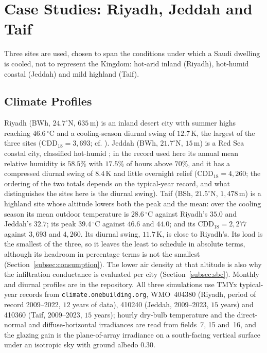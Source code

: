 \documentclass[pdflatex,sn-mathphys-num,iicol]{sn-jnl}
\theoremstyle{thmstyleone}\newtheorem{proposition}{Proposition}\newtheorem{corollary}{Corollary}
\theoremstyle{thmstyletwo}\newtheorem{remark}{Remark}\newtheorem{observation}{Observation}
\theoremstyle{thmstylethree}\newtheorem{definition}{Definition}
\begin{document}
\section{Case Studies: Riyadh, Jeddah and Taif}
\label{sec:casestudy}

Three sites are used, chosen to span the conditions under which a Saudi dwelling is cooled, not to represent the Kingdom: hot-arid inland (Riyadh), hot-humid coastal (Jeddah) and mild highland (Taif).
 
\subsection{Climate Profiles}
\label{subsec:climate}
 
Riyadh (BWh, $24.7^\circ$N, $635\,$m) is an inland desert city with summer highs reaching $46.6\,^\circ$C and a cooling-season diurnal swing of $12.7\,$K, the largest of the three sites (CDD$_{18}=3{,}693$; cf. \citep{Haddad2024}). Jeddah (BWh, $21.7^\circ$N, $15\,$m) is a Red Sea coastal city, classified hot-humid \citep{Rodrigues2025}; in the record used here its annual mean relative humidity is $58.5\%$ with $17.5\%$ of hours above $70\%$, and it has a compressed diurnal swing of $8.4\,$K and little overnight relief (CDD$_{18}=4{,}260$; the ordering of the two totals depends on the typical-year record, and what distinguishes the sites here is the diurnal swing). Taif (BSh, $21.5^\circ$N, $1{,}478\,$m) is a highland site whose altitude lowers both the peak and the mean: over the cooling season its mean outdoor temperature is $28.6\,^\circ$C against Riyadh's $35.0$ and Jeddah's $32.7$; its peak $39.4\,^\circ$C against $46.6$ and $44.0$; and its CDD$_{18}=2{,}277$ against $3{,}693$ and $4{,}260$. Its diurnal swing, $11.7\,$K, is close to Riyadh's. Its load is the smallest of the three, so it leaves the least to schedule in absolute terms, although its headroom in percentage terms is not the smallest (Section~\ref{subsec:consumption}). The lower air density at that altitude is also why the infiltration conductance is evaluated per city (Section~\ref{subsec:sbc}). Monthly and diurnal profiles are in the repository. All three simulations use TMYx typical-year records from \texttt{climate.onebuilding.org}, WMO~404380 (Riyadh, period of record 2009--2022, $12$ years of data), 410240 (Jeddah, 2009--2023, $15$ years) and 410360 (Taif, 2009--2023, $15$ years); hourly dry-bulb temperature and the direct-normal and diffuse-horizontal irradiances are read from fields~7, 15 and~16, and the glazing gain is the plane-of-array irradiance on a south-facing vertical surface under an isotropic sky with ground albedo $0.30$.
 
\end{document}
